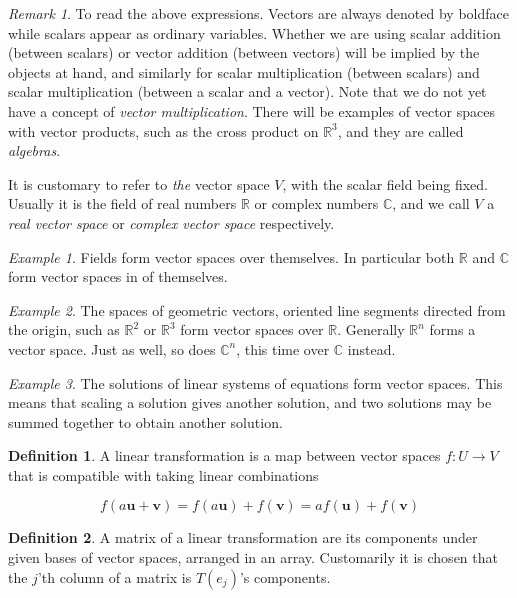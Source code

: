 \documentclass[12pt]{article}
\theoremstyle{definition}
\newtheorem{definition}{Definition}[section]
\theoremstyle{remark}
\newtheorem*{remark}{Remark}
\theoremstyle{example}
\newtheorem{example}{Example}
\def\b#1{\textbf{#1}}
\begin{document}
\begin{remark}
	To read the above expressions. Vectors are always denoted by boldface while scalars appear as ordinary variables. Whether we are using scalar addition (between scalars) or vector addition (between vectors) will be implied by the objects at hand, and similarly for scalar multiplication (between scalars) and scalar multiplication (between a scalar and a vector). Note that we do not yet have a concept of \textit{vector multiplication}. There will be examples of vector spaces with vector products, such as the cross product on $\mathbb{R}^3$, and they are called \textit{algebras}.
	
	It is customary to refer to \textit{the} vector space $V$, with the scalar field being fixed. Usually it is the field of real numbers $\mathbb{R}$ or complex numbers $\mathbb{C}$, and we call $V$ a \textit{real vector space} or \textit{complex vector space} respectively.
\end{remark}

\begin{example}
	Fields form vector spaces over themselves. In particular both $\mathbb{R}$ and $\mathbb{C}$ form vector spaces in of themselves.
\end{example}

\begin{example}
	The spaces of geometric vectors, oriented line segments directed from the origin, such as $\mathbb{R}^2$ or $\mathbb{R}^3$ form vector spaces over $\mathbb{R}$. Generally $\mathbb{R}^n$ forms a vector space. Just as well, so does $\mathbb{C}^n$, this time over $\mathbb{C}$ instead.
\end{example}

\begin{example}
	The solutions of linear systems of equations form vector spaces. This means that scaling a solution gives another solution, and two solutions may be summed together to obtain another solution.
\end{example}

\begin{definition}
	A linear transformation is a map between vector spaces $f:U\to V$ that is compatible with taking linear combinations
	
	\begin{equation}
		f(a\b{u}+\b{v}) = f(a\b{u})+f(\b{v})=af(\b{u})+f(\b{v})
	\end{equation}
\end{definition}

\begin{definition}
	A matrix of a linear transformation are its components under given bases of vector spaces, arranged in an array. Customarily it is chosen that the $j$'th column of a matrix is $T(e_j)$'s components.
\end{definition}
\end{document}
